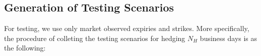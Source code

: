 \documentclass[letterpaper,12pt,titlepage,oneside,final]{book}
\numberwithin{equation}{section}
\theoremstyle{definition}
\newcommand{\Vmkt}{V^{mkt}}
\begin{document}
	
	

%	

\subsection{Generation of  Testing Scenarios}\label{sec:AugTest}
For testing, we use only market observed expiries and strikes. More specifically, the procedure of colleting the testing scenarios for hedging $N_H$ business days is as the following:
\end{document}
